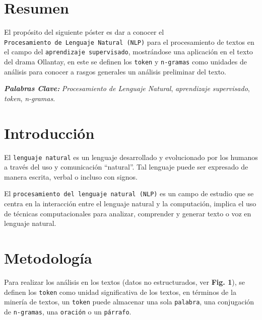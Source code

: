 \documentclass[article,30pt,extrafontsizes]{memoir}
\begin{document}
\begin{multicols*}{3}
	
\large{  %
\color{bodytextcol}
\section{Resumen}\label{resumen}

El propósito del siguiente póster es dar a conocer el \texttt{\colorbox{tio}{\textcolor{titleboxbgcol}{Procesamiento\ de\ Lenguaje\ Natural (NLP)}}} para el procesamiento de textos en el campo del \texttt{\colorbox{tio}{\textcolor{titleboxbgcol}{aprendizaje\ supervisado}}}, mostrándose una aplicación en el texto del drama Ollantay, en este se definen los \texttt{\colorbox{tio}{\textcolor{titleboxbgcol}{token}}} y \texttt{\colorbox{tio}{\textcolor{titleboxbgcol}{n-gramas}}} como unidades de análisis para conocer a rasgos generales un análisis preliminar del texto.

\vspace{0.5em}

\textbf{\emph{Palabras Clave:}} \emph{Procesamiento de Lenguaje Natural}, \emph{aprendizaje supervisado}, \emph{token}, \emph{n-gramas}.

\section{Introducción}\label{introducciuxf3n}

El \texttt{\colorbox{tio}{\textcolor{titleboxbgcol}{lenguaje natural}}} es un lenguaje desarrollado y evolucionado por los humanos a través del uso y comunicación ``natural''. Tal lenguaje puede ser expresado de manera escrita, verbal o incluso con signos.\autocite{salkar}

\vspace{0.5em}

El \texttt{\colorbox{tio}{\textcolor{titleboxbgcol}{procesamiento del lenguaje natural (NLP)}}} es un campo de estudio que se centra en la interacción entre el lenguaje natural y la computación, implica el uso de técnicas computacionales para analizar, comprender y generar texto o voz en lenguaje natural.

\section{Metodología}\label{metodologuxeda}

Para realizar los análisis en los textos (datos no estructurados, ver \textbf{Fig. 1}), se definen los \texttt{\colorbox{tio}{\textcolor{titleboxbgcol}{token}}} como unidad significativa de los textos, en términos de la minería de textos, un \texttt{\colorbox{tio}{\textcolor{titleboxbgcol}{token}}} puede almacenar una sola \texttt{\colorbox{tio}{\textcolor{titleboxbgcol}{palabra}}}, una conjugación de \texttt{\colorbox{tio}{\textcolor{titleboxbgcol}{n-gramas}}}, una \texttt{\colorbox{tio}{\textcolor{titleboxbgcol}{oración}}} o un \texttt{\colorbox{tio}{\textcolor{titleboxbgcol}{párrafo}}}.\autocite{silge}

}
\end{multicols*}
\end{document}
